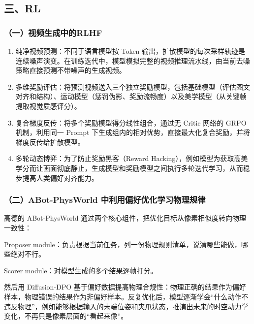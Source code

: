 \hypertarget{ux4e09rl}{%
\subsection{三、RL}\label{ux4e09rl}}

\hypertarget{ux4e00ux89c6ux9891ux751fux6210ux4e2dux7684rlhf}{%
\subsubsection{（一）视频生成中的RLHF}\label{ux4e00ux89c6ux9891ux751fux6210ux4e2dux7684rlhf}}

\begin{enumerate}
\def\labelenumi{\arabic{enumi}.}
\item
  纯净视频预测：不同于语言模型按 Token 输出，扩散模型的每次采样轨迹是连续噪声演变。在训练迭代中，模型模拟完整的视频推理流水线，由当前去噪策略直接预测不带噪声的生成视频。
\item
  多维奖励评估：将预测视频送入三个独立奖励模型，包括基础模型（评估图文对齐和结构）、运动模型（惩罚伪影、奖励流畅度）以及美学模型（从关键帧提取视觉质感评分）。
\item
  复合梯度反传：将多个奖励模型得分线性组合，通过无 Critic 网络的 GRPO 机制，利用同一 Prompt 下生成组内的相对优势，直接最大化复合奖励，并将梯度反传给扩散模型。
\item
  多轮动态博弈：为了防止奖励黑客（Reward Hacking），例如模型为获取高美学分而让画面彻底静止，生成模型和奖励模型之间执行多轮迭代学习，从而稳步提高人类偏好对齐能力。
\end{enumerate}

\hypertarget{ux4e8cabot-physworld-ux4e2dux5229ux7528ux504fux597dux4f18ux5316ux5b66ux4e60ux7269ux7406ux89c4ux5f8b}{%
\subsubsection{（二）ABot-PhysWorld 中利用偏好优化学习物理规律}\label{ux4e8cabot-physworld-ux4e2dux5229ux7528ux504fux597dux4f18ux5316ux5b66ux4e60ux7269ux7406ux89c4ux5f8b}}

高德的 ABot-PhysWorld 通过两个核心组件，把优化目标从像素相似度转向物理一致性：

Proposer module：负责根据当前任务，列一份物理规则清单，说清哪些能做，哪些绝对不行。

Scorer module：对模型生成的多个结果逐帧打分。

然后用 Diffusion-DPO 基于偏好数据提高物理合规性：物理正确的结果作为偏好样本，物理错误的结果作为非偏好样本。反复优化后，模型逐渐学会``什么动作不违反物理''，例如能够根据输入的末端位姿和夹爪状态，推演出未来的时空动力学变化，不再只是像素层面的``看起来像''。

